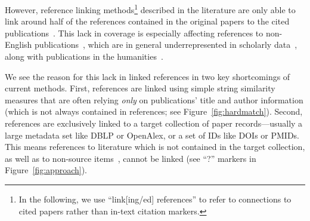 However, reference linking methods\footnote{In the following, we use ``link[ing/ed] references'' to refer to connections to cited papers rather than in-text citation markers.} described in the literature are only able to link around half of the references contained in the original papers to the cited publications~\cite{Lo2020,Saier2020}. This lack in coverage is especially affecting references to non-English publications~\cite{Saier2021}, which are in general underrepresented in scholarly data~\cite{Vera-Baceta2019,Liu2019,Moed2018,Moskaleva2019}, along with publications in the humanities~\cite{Colavizza2019,Kellsey2004}.

We see the reason for this lack in linked references in two key shortcomings of current methods.
First, references are linked using simple string similarity measures that are often relying \emph{only} on publications' title and author information (which is not always contained in references; see Figure~\ref{fig:hardmatch}). %
Second, references are exclusively linked to a target collection of paper records---usually a large metadata set like DBLP or OpenAlex, or a set of IDs like DOIs or PMIDs. This means references to literature which is not contained in the target collection, as well as to non-source items~\cite{Chi2014}, cannot be linked (see ``?'' markers in Figure~\ref{fig:approach}).

